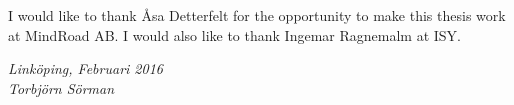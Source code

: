 \begin{acknowledgments}%
	I would like to thank Åsa Detterfelt for the opportunity to make this thesis work at MindRoad AB. I would also like to thank Ingemar Ragnemalm at ISY.
	
	\addvspace{1em}%
	\begin{flushright}%
    \textit{%
		Linköping, Februari 2016 \\%
		Torbjörn Sörman%
	}%
	\end{flushright}%
	
\end{acknowledgments}%
